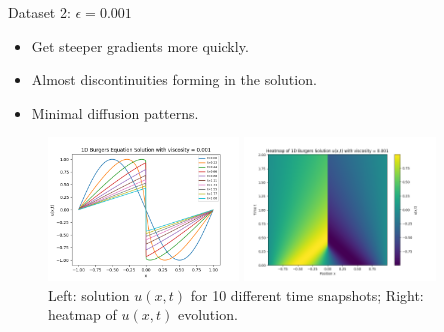 \begin{secframe}
\begin{block}{Dataset 2: $\epsilon = 0.001$}
\begin{itemize}
  \item \small Get steeper gradients more quickly.
  \item \small Almost discontinuities forming in the solution.
  \item \small Minimal diffusion patterns.
\end{itemize}
\end{block}

\begin{figure}[h!]
    \centering
    \begin{minipage}[t]{0.48\linewidth}
        \centering
        \includegraphics[height=3.8cm]{images/burger/graphical_visualization_1DBurgers_visc_0001.png}
    \end{minipage}\hfill
    \begin{minipage}[t]{0.48\linewidth}
        \centering
        \includegraphics[height=3.8cm]{images/burger/Heatmap_1DBurgers_visc_0001.png}
    \end{minipage}
    \caption{\scriptsize Left: solution $u(x,t)$ for 10 different time snapshots; Right: heatmap of $u(x,t)$ evolution.}
\end{figure}
\end{secframe}

